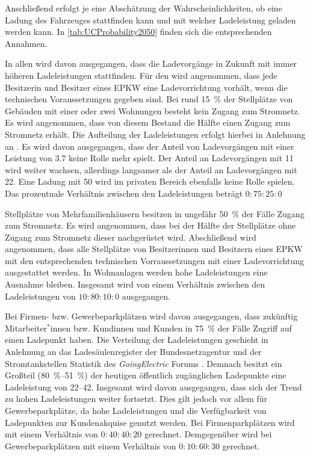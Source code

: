 Anschließend erfolgt je \UC eine Abschätzung der Wahrscheinlichkeiten, ob eine Ladung des Fahrzeuges stattfinden kann und mit welcher Ladeleistung geladen werden kann.
In \autoref{tab:UCProbability2050} finden sich die entsprechenden Annahmen.



In allen \UCs wird davon ausgegangen, dass die Ladevorgänge in Zukunft mit immer höheren Ladeleistungen stattfinden.
Für den \UC \Eigenheim wird angenommen, dass jede Besitzerin und Besitzer eines \gls{EPKW} eine Ladevorrichtung vorhält, wenn die technischen Voraussetzungen gegeben sind.
Bei rund \SI{15}{\percent} der Stellplätze von Gebäuden mit einer oder zwei Wohnungen besteht kein Zugang zum Stromnetz. \cite{dena2020}
Es wird angenommen, dass von diesem Bestand die Hälfte einen Zugang zum Stromnetz erhält.
Die Aufteilung der Ladeleistungen erfolgt hierbei in Anlehnung an \cite{NPZMAVE2020}.
Es wird davon ausgegangen, dass der Anteil von Ladevorgängen mit einer Leistung von \SI{3.7}{\kw} keine Rolle mehr spielt.
Der Anteil an Ladevorgängen mit \SI{11}{\kw} wird weiter wachsen, allerdings langsamer als der Anteil an Ladevorgängen mit \SI{22}{\kw}.
Eine Ladung mit \SI{50}{\kw} wird im privaten Bereich ebenfalls keine Rolle spielen.
Das prozentuale Verhältnis zwischen den Ladeleistungen beträgt \(0:75:25:0\)\medskip

Stellplätze von Mehrfamilienhäusern besitzen in ungefähr \SI{50}{\percent} der Fälle Zugang zum Stromnetz. \cite{dena2020}
Es wird angenommen, dass bei der Hälfte der Stellplätze ohne Zugang zum Stromnetz dieser nachgerüstet wird.
Abschließend wird angenommen, dass alle Stellplätze von Besitzerinnen und Besitzern eines \gls{EPKW} mit den entsprechenden technischen Vorraussetzungen mit einer Ladevorrichtung ausgestattet werden.
In Wohnanlagen werden hohe Ladeleistungen eine Ausnahme bleiben.
Insgesamt wird von einem Verhältnis zwischen den Ladeleistungen von \(10:80:10:0\) ausgegangen.\medskip

Bei Firmen- bzw. Gewerbeparkplätzen wird davon ausgegangen, dass zukünftig Mitarbeiter$^*$innen bzw. Kundinnen und Kunden in \SI{75}{\percent} der Fälle Zugriff auf einen Ladepunkt haben.
Die Verteilung der Ladeleistungen geschieht in Anlehnung an das Ladesäulenregister der Bundesnetzagentur \cite[][Stand: ]{BundesnetzagenturElektrizitaet2020} und der Stromtankstellen Statistik des \textit{GoingElectric} Forums \cite[][Stand: ]{Weemaes2020}.
Demnach besitzt ein Großteil (\SIrange[range-phrase=~bzw.~]{80}{51}{\percent}) der heutigen öffentlich zugänglichen Ladepunkte eine Ladeleistung von \SIrange{22}{42}{\kw}.
Insgesamt wird davon ausgegangen, dass sich der Trend zu hohen Ladeleistungen weiter fortsetzt.
Dies gilt jedoch vor allem für Gewerbeparkplätze, da hohe Ladeleistungen und die Verfügbarkeit von Ladepunkten zur Kundenakquise genutzt werden.
Bei Firmenparkplätzen wird mit einem Verhältnis von \(0:40:40:20\) gerechnet.
Demgegenüber wird bei Gewerbeparkplätzen mit einem Verhältnis von \(0:10:60:30\) gerechnet.\medskip

